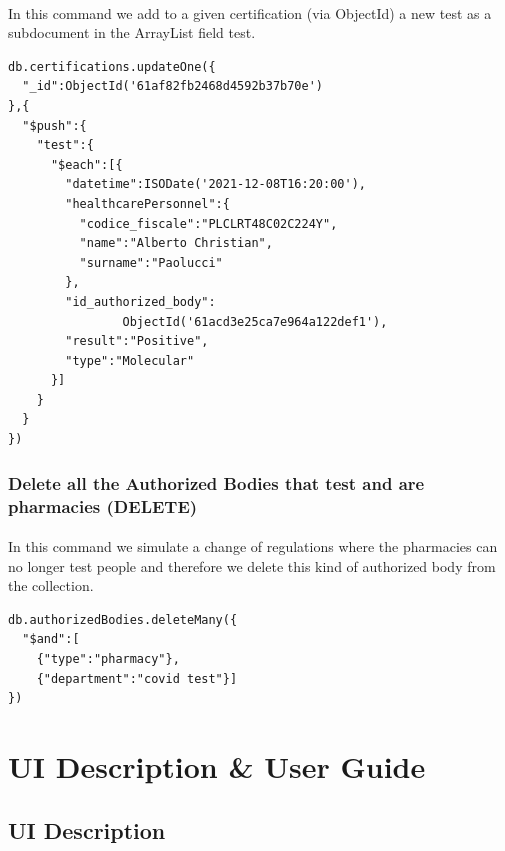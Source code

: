 \documentclass[a4paper,12pt]{article}
\begin{document}
\paragraph{} In this command we add to a given certification (via ObjectId) a new test as a subdocument in the ArrayList field test.
\begin{tcolorbox}[colback=orange!5!white,colframe=orange!75!black,title=COMMAND]
\begin{verbatim}
db.certifications.updateOne({
  "_id":ObjectId('61af82fb2468d4592b37b70e')
},{
  "$push":{
    "test":{
      "$each":[{
        "datetime":ISODate('2021-12-08T16:20:00'),
        "healthcarePersonnel":{
          "codice_fiscale":"PLCLRT48C02C224Y",
          "name":"Alberto Christian",
          "surname":"Paolucci"
        },
        "id_authorized_body":
                ObjectId('61acd3e25ca7e964a122def1'),
        "result":"Positive",
        "type":"Molecular"
      }]
    }
  }
})
\end{verbatim}
\end{tcolorbox}


\subsubsection{Delete all the Authorized Bodies that test and are pharmacies (DELETE)}
\paragraph{} In this command we simulate a change of regulations where the pharmacies can no longer test people and therefore we delete this kind of authorized body from the collection.
\begin{tcolorbox}[colback=orange!5!white,colframe=orange!75!black,title=COMMAND]
\begin{verbatim}
db.authorizedBodies.deleteMany({
  "$and":[
    {"type":"pharmacy"},
    {"department":"covid test"}]
})

\end{verbatim}
\end{tcolorbox}
\clearpage
\section{UI Description \& User Guide}
\subsection{UI Description}
\end{document}
